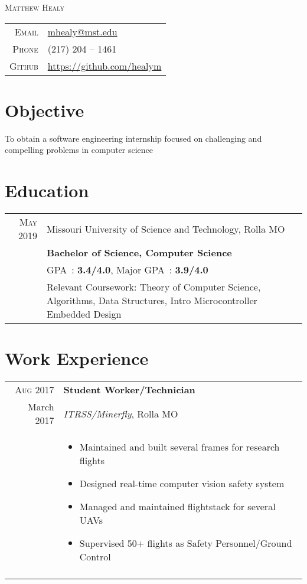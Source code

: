 \documentclass[a4paper,10pt]{article}
\newcommand{\br}{\\\multicolumn{2}{c}{}}
\begin{document}
\pagestyle{empty}

\par{\centering
    {\Huge \textsc{Matthew Healy}
}\bigskip\par}

\begin{center}
\begin{tabular}{rl}
    \textsc{Email } & \href{mailto:mhealy@mst.edu}{mhealy@mst.edu} \\
    \textsc{Phone }        & (217) 204 -- 1461  \\
    \textsc{Github }      & \url{https://github.com/healym}
\end{tabular}
\end{center}

\section{Objective}
To obtain a software engineering internship focused on challenging and compelling problems in computer science


\section{Education}
\begin{tabular}{r|p{15cm}}
    \textsc{May} 2019 & Missouri University of Science and Technology, Rolla MO  \\
                      & \textbf{Bachelor of Science, Computer Science} \\
                      & GPA~: \textbf{3.4/4.0}, Major GPA~: \textbf{3.9/4.0} \\
                      & Relevant Coursework:
                      Theory of Computer Science,
                      Algorithms,
                      Data Structures,
                      Intro Microcontroller Embedded Design
\end{tabular}


\section{Work Experience}
\begin{tabular}{r|p{15cm}}
    \textsc{Aug 2017} & \textbf{Student Worker/Technician} \\
    March 2017          & \textit{ITRSS/Minerfly}, Rolla MO \\ &
    \begin{itemize}
    \item{Maintained and built several frames for research flights}
    \item{Designed real-time computer vision safety system}
    \item{Managed and maintained flightstack for several UAVs}
    \item{Supervised 50+ flights as Safety Personnel/Ground Control}

    \end{itemize} \br\\

\end{tabular}
\end{document}
